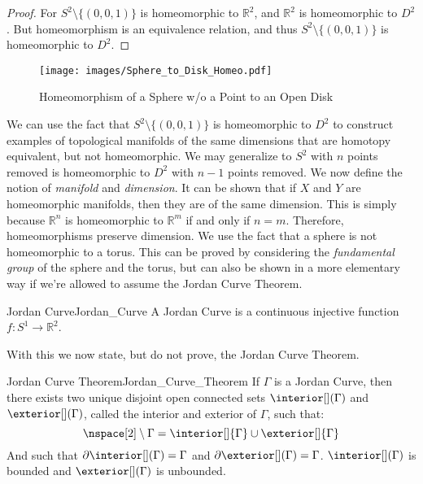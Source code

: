 \documentclass{article}                                                        %
\begin{document}
        \begin{proof}
            For $S^{2}\setminus\{(0,0,1)\}$ is homeomorphic to
            $\mathbb{R}^{2}$, and $\mathbb{R}^{2}$ is homeomorphic to
            $D^{2}$. But homeomorphism is an equivalence relation, and
            thus $S^{2}\setminus\{(0,0,1)\}$ is homeomorphic to $D^{2}$.
        \end{proof}
        \begin{figure}[H]
            \centering
            \captionsetup{type=figure}
            \texttt{[image: images/Sphere\_to\_Disk\_Homeo.pdf]}
            \caption{Homeomorphism of a Sphere w/o a Point to an Open Disk}
            \label{fig:homeomorphism_S_2_wo_North_Pole_and_R_2_2}
        \end{figure}
        We can use the fact that $S^{2}\setminus \{(0,0,1)\}$ is
        homeomorphic to $D^{2}$ to construct examples of topological
        manifolds of the same dimensions that are homotopy equivalent, but
        not homeomorphic. We may generalize to $S^{2}$ with $n$ points
        removed is homeomorphic to $D^{2}$ with $n-1$ points removed.
        We now define the notion of \textit{manifold} and \textit{dimension}.
        It can be shown that if $X$ and $Y$ are homeomorphic manifolds,
        then they are of the same dimension. This is simply because
        $\mathbb{R}^{n}$ is homeomorphic to $\mathbb{R}^{m}$ if and only if
        $n=m$. Therefore, homeomorphisms preserve dimension. We use the
        fact that a sphere is not homeomorphic to a torus. This can be
        proved by considering the \textit{fundamental group} of the sphere
        and the torus, but can also be shown in a more elementary way if
        we're allowed to assume the Jordan Curve Theorem.
        \begin{ldefinition}{Jordan Curve}{Jordan_Curve}
            A Jordan Curve is a continuous injective function
            $f:S^{1}\rightarrow\mathbb{R}^{2}$.
        \end{ldefinition}
        With this we now state, but do not prove, the Jordan Curve Theorem.
        \begin{ftheorem}{Jordan Curve Theorem}{Jordan_Curve_Theorem}
            If $\Gamma$ is a Jordan Curve, then there exists two unique
            disjoint open connected sets $\interior[](\Gamma)$ and
            $\exterior[](\Gamma)$, called the interior and exterior of $\Gamma$,
            such that:
            \begin{equation*}
                \nspace[2]\setminus\Gamma
                    =\interior[]{\Gamma}\cup\exterior[]{\Gamma}
            \end{equation*}
            And such that $\partial\interior[](\Gamma)=\Gamma$ and
            $\partial\exterior[](\Gamma)=\Gamma$. $\interior[](\Gamma)$ is
            bounded and $\exterior[](\Gamma)$ is unbounded.
        \end{ftheorem}
\end{document}
